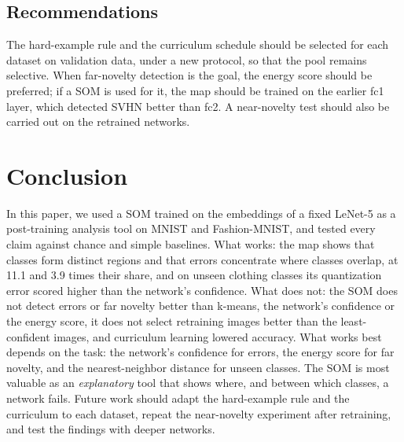 \documentclass[preprint,review,12pt]{elsarticle}
\begin{document}
\subsection{Recommendations}
The hard-example rule and the curriculum schedule should be selected for each dataset on validation data, under a new protocol, so that the pool remains selective. When far-novelty detection is the goal, the energy score should be preferred; if a SOM is used for it, the map should be trained on the earlier fc1 layer, which detected SVHN better than fc2. A near-novelty test should also be carried out on the retrained networks.

\FloatBarrier
\section{Conclusion}\label{sec:conclusion}

In this paper, we used a SOM trained on the embeddings of a fixed LeNet-5 as a post-training analysis tool on MNIST and Fashion-MNIST, and tested every claim against chance and simple baselines. What works: the map shows that classes form distinct regions and that errors concentrate where classes overlap, at 11.1 and 3.9 times their share, and on unseen clothing classes its quantization error scored higher than the network's confidence. What does not: the SOM does not detect errors or far novelty better than k-means, the network's confidence or the energy score, it does not select retraining images better than the least-confident images, and curriculum learning lowered accuracy. What works best depends on the task: the network's confidence for errors, the energy score for far novelty, and the nearest-neighbor distance for unseen classes. The SOM is most valuable as an \emph{explanatory} tool that shows where, and between which classes, a network fails. Future work should adapt the hard-example rule and the curriculum to each dataset, repeat the near-novelty experiment after retraining, and test the findings with deeper networks.
\end{document}
